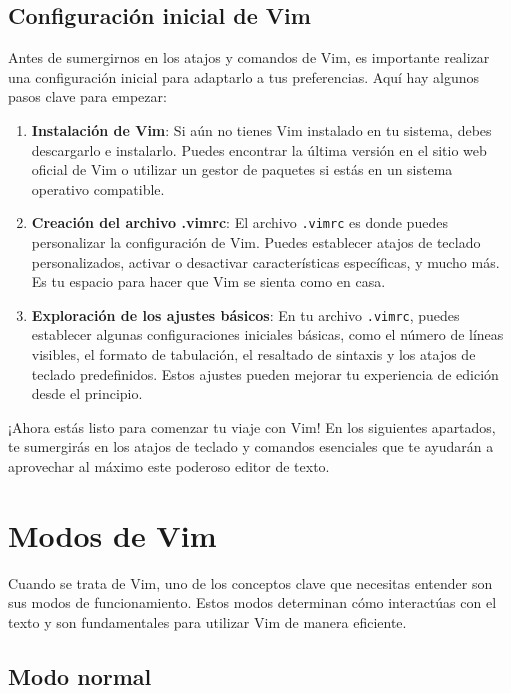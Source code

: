 \documentclass[
  a4paper,
]{article}
\begin{document}
\hypertarget{configuraciuxf3n-inicial-de-vim}{%
\subsection{Configuración inicial de
Vim}\label{configuraciuxf3n-inicial-de-vim}}

Antes de sumergirnos en los atajos y comandos de Vim, es importante
realizar una configuración inicial para adaptarlo a tus preferencias.
Aquí hay algunos pasos clave para empezar:

\begin{enumerate}
\def\labelenumi{\arabic{enumi}.}
\item
  \textbf{Instalación de Vim}: Si aún no tienes Vim instalado en tu
  sistema, debes descargarlo e instalarlo. Puedes encontrar la última
  versión en el sitio web oficial de Vim o utilizar un gestor de
  paquetes si estás en un sistema operativo compatible.
\item
  \textbf{Creación del archivo .vimrc}: El archivo \texttt{.vimrc} es
  donde puedes personalizar la configuración de Vim. Puedes establecer
  atajos de teclado personalizados, activar o desactivar características
  específicas, y mucho más. Es tu espacio para hacer que Vim se sienta
  como en casa.
\item
  \textbf{Exploración de los ajustes básicos}: En tu archivo
  \texttt{.vimrc}, puedes establecer algunas configuraciones iniciales
  básicas, como el número de líneas visibles, el formato de tabulación,
  el resaltado de sintaxis y los atajos de teclado predefinidos. Estos
  ajustes pueden mejorar tu experiencia de edición desde el principio.
\end{enumerate}

¡Ahora estás listo para comenzar tu viaje con Vim! En los siguientes
apartados, te sumergirás en los atajos de teclado y comandos esenciales
que te ayudarán a aprovechar al máximo este poderoso editor de texto.

\hypertarget{modos-de-vim}{%
\section{Modos de Vim}\label{modos-de-vim}}

Cuando se trata de Vim, uno de los conceptos clave que necesitas
entender son sus modos de funcionamiento. Estos modos determinan cómo
interactúas con el texto y son fundamentales para utilizar Vim de manera
eficiente.

\hypertarget{modo-normal}{%
\subsection{Modo normal}\label{modo-normal}}
\end{document}
